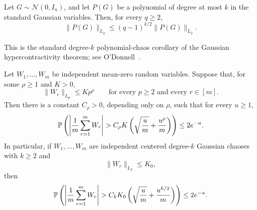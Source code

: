 \begin{theorem}
\label{thm:gaussian-hypercontractivity}
Let \(G\sim\mathcal N(0,I_n)\), and let \(P(G)\) be a polynomial of degree at
most \(k\) in the standard Gaussian variables. Then, for every \(q\ge2\),
\[
\|P(G)\|_{L_q}
\le
(q-1)^{k/2}\|P(G)\|_{L_2}.
\]
\end{theorem}

\noindent
This is the standard degree-\(k\) polynomial-chaos corollary of the Gaussian
hypercontractivity theorem; see O'Donnell~\cite[Theorem~11.23]{odonnell2014analysis}.

\begin{theorem}
\label{thm:subweibull-bernstein-average}
Let \(W_1,\dots,W_m\) be independent mean-zero random variables. Suppose that,
for some \(\rho\ge1\) and \(K>0\),
\[
\|W_r\|_{L_p}\le Kp^\rho
\qquad\text{for every }p\ge2\text{ and every }r\in[m].
\]
Then there is a constant \(C_\rho>0\), depending only on \(\rho\), such that for
every \(u\ge1\),
\[
\mathbb{P}\left(
\left|
\frac1m\sum_{r=1}^m W_r
\right|
>
C_\rho K\left(
\sqrt{\frac{u}{m}}+
\frac{u^\rho}{m}
\right)
\right)
\le 2e^{-u}.
\]
In particular, if \(W_1,\dots,W_m\) are independent centered degree-\(k\)
Gaussian chaoses with \(k\ge2\) and
\[
\|W_r\|_{L_2}\le K_0,
\]
then
\[
\mathbb{P}\left(
\left|
\frac1m\sum_{r=1}^m W_r
\right|
>
C_kK_0\left(
\sqrt{\frac{u}{m}}+
\frac{u^{k/2}}{m}
\right)
\right)
\le 2e^{-u}.
\]
\end{theorem}

